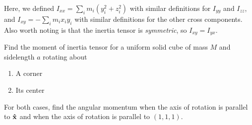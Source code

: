 Here, we defined $I_{xx} = \sum_i m_i(y_i^2+z_i^2)$ with similar definitions for $I_{yy}$ and $I_{zz}$, and $I_{xy} = -\sum_i m_i x_iy_i$ with similar definitions for the other cross components. Also worth noting is that the inertia tensor is \textit{symmetric}, so $I_{xy} = I_{yx}$. 
\begin{example}
    Find the moment of inertia tensor for a uniform solid cube of mass $M$ and sidelength $a$ rotating about
    \begin{enumerate}
        \item A corner
        \item Its center
    \end{enumerate}
    For both cases, find the angular momentum when the axis of rotation is parallel to $\mathbf{\hat{x}}$ and when the axis of rotation is parallel to $(1,1,1)$.


\end{example}
